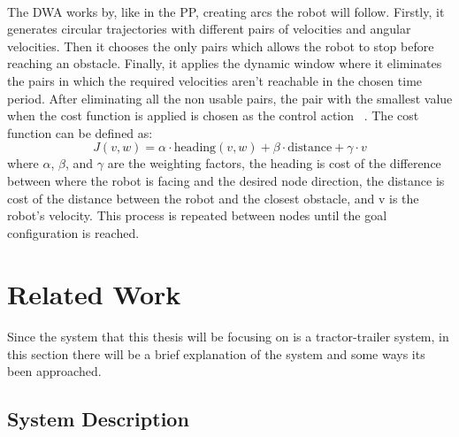 \paragraph{}The \gls{DWA} works by, like in the \gls{PP}, creating arcs the robot will follow. Firstly, it generates 
circular trajectories with different pairs of velocities and angular velocities. Then it chooses 
the only pairs which allows the robot to stop before reaching an obstacle. Finally, it applies the 
dynamic window where it eliminates the pairs in which the required velocities aren't reachable in the 
chosen time period. After eliminating all the non usable pairs, the pair with the smallest value 
when the cost function is applied is chosen as the control action ~\cite{DWAT}. The cost function can be defined as:
\begin{equation}
    J(v, w) = \alpha \cdot \text{heading}(v, w) + \beta \cdot \text{distance} + \gamma \cdot v
\end{equation}
where $\alpha$, $\beta$, and $\gamma$ are the weighting factors, the heading is cost of the difference between where the robot 
is facing and the desired node direction, the distance is cost of the distance between the robot and the closest obstacle, and v is the
 robot's velocity. This process is repeated between nodes until the goal configuration is reached.

\section{Related Work}
\label{sec:TTS}
\paragraph{}Since the system that this thesis will be focusing on is a tractor-trailer system, 
in this section there will be a brief explanation of the system and some ways its been approached.

\subsection{System Description}
\label{subsec:SD}
